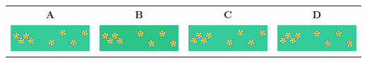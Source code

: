 \documentclass[12pt, a4paper]{article}
\begin{document}
\begin{minipage}{\textwidth}
			\begin{table}[H]
				\begin{tabulary}{\linewidth}{|C|C|C|C|}
					\hline
					\textbf{A} & \textbf{B} & \textbf{C} & \textbf{D} \\
					\includegraphics[width=\linewidth]{option1} &
					\includegraphics[width=\linewidth]{option2} &
					\includegraphics[width=\linewidth]{option3} &
					\includegraphics[width=\linewidth]{option4} \\
					\hline 
				\end{tabulary}
			\end{table}
	\end{minipage} \\ \\
		
\end{document}
